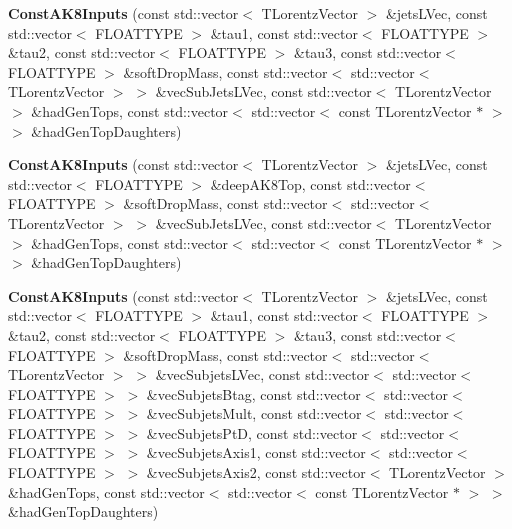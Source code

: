 \begin{DoxyCompactItemize}
\item 
\hypertarget{classttUtility_1_1ConstAK8Inputs_a528a5eb1b2efbec86749a7cc9867cad9}{{\bfseries Const\-A\-K8\-Inputs} (const std\-::vector$<$ T\-Lorentz\-Vector $>$ \&jets\-L\-Vec, const std\-::vector$<$ F\-L\-O\-A\-T\-T\-Y\-P\-E $>$ \&tau1, const std\-::vector$<$ F\-L\-O\-A\-T\-T\-Y\-P\-E $>$ \&tau2, const std\-::vector$<$ F\-L\-O\-A\-T\-T\-Y\-P\-E $>$ \&tau3, const std\-::vector$<$ F\-L\-O\-A\-T\-T\-Y\-P\-E $>$ \&soft\-Drop\-Mass, const std\-::vector$<$ std\-::vector$<$ T\-Lorentz\-Vector $>$ $>$ \&vec\-Sub\-Jets\-L\-Vec, const std\-::vector$<$ T\-Lorentz\-Vector $>$ \&had\-Gen\-Tops, const std\-::vector$<$ std\-::vector$<$ const T\-Lorentz\-Vector $\ast$ $>$$>$ \&had\-Gen\-Top\-Daughters)}\label{classttUtility_1_1ConstAK8Inputs_a528a5eb1b2efbec86749a7cc9867cad9}

\item 
\hypertarget{classttUtility_1_1ConstAK8Inputs_a0a501ad577d002031a5fe49596c1072d}{{\bfseries Const\-A\-K8\-Inputs} (const std\-::vector$<$ T\-Lorentz\-Vector $>$ \&jets\-L\-Vec, const std\-::vector$<$ F\-L\-O\-A\-T\-T\-Y\-P\-E $>$ \&deep\-A\-K8\-Top, const std\-::vector$<$ F\-L\-O\-A\-T\-T\-Y\-P\-E $>$ \&soft\-Drop\-Mass, const std\-::vector$<$ std\-::vector$<$ T\-Lorentz\-Vector $>$ $>$ \&vec\-Sub\-Jets\-L\-Vec, const std\-::vector$<$ T\-Lorentz\-Vector $>$ \&had\-Gen\-Tops, const std\-::vector$<$ std\-::vector$<$ const T\-Lorentz\-Vector $\ast$ $>$$>$ \&had\-Gen\-Top\-Daughters)}\label{classttUtility_1_1ConstAK8Inputs_a0a501ad577d002031a5fe49596c1072d}

\item 
\hypertarget{classttUtility_1_1ConstAK8Inputs_a727008c535477f073ac67376a7f20179}{{\bfseries Const\-A\-K8\-Inputs} (const std\-::vector$<$ T\-Lorentz\-Vector $>$ \&jets\-L\-Vec, const std\-::vector$<$ F\-L\-O\-A\-T\-T\-Y\-P\-E $>$ \&tau1, const std\-::vector$<$ F\-L\-O\-A\-T\-T\-Y\-P\-E $>$ \&tau2, const std\-::vector$<$ F\-L\-O\-A\-T\-T\-Y\-P\-E $>$ \&tau3, const std\-::vector$<$ F\-L\-O\-A\-T\-T\-Y\-P\-E $>$ \&soft\-Drop\-Mass, const std\-::vector$<$ std\-::vector$<$ T\-Lorentz\-Vector $>$ $>$ \&vec\-Subjets\-L\-Vec, const std\-::vector$<$ std\-::vector$<$ F\-L\-O\-A\-T\-T\-Y\-P\-E $>$ $>$ \&vec\-Subjets\-Btag, const std\-::vector$<$ std\-::vector$<$ F\-L\-O\-A\-T\-T\-Y\-P\-E $>$ $>$ \&vec\-Subjets\-Mult, const std\-::vector$<$ std\-::vector$<$ F\-L\-O\-A\-T\-T\-Y\-P\-E $>$ $>$ \&vec\-Subjets\-Pt\-D, const std\-::vector$<$ std\-::vector$<$ F\-L\-O\-A\-T\-T\-Y\-P\-E $>$ $>$ \&vec\-Subjets\-Axis1, const std\-::vector$<$ std\-::vector$<$ F\-L\-O\-A\-T\-T\-Y\-P\-E $>$ $>$ \&vec\-Subjets\-Axis2, const std\-::vector$<$ T\-Lorentz\-Vector $>$ \&had\-Gen\-Tops, const std\-::vector$<$ std\-::vector$<$ const T\-Lorentz\-Vector $\ast$ $>$ $>$ \&had\-Gen\-Top\-Daughters)}\label{classttUtility_1_1ConstAK8Inputs_a727008c535477f073ac67376a7f20179}


\end{DoxyCompactItemize}
